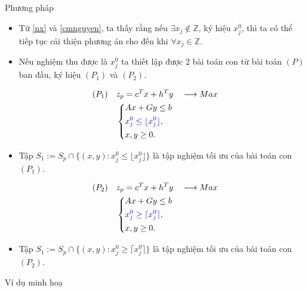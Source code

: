 \documentclass{beamer}
\begin{document}
\begin{frame}{Phương pháp}
\large
\begin{itemize}
\item Từ \eqref{nx} và \eqref{cmnguyen}, ta thấy rằng nếu $\exists x_j \notin \mathbb{Z}$, ký hiệu $x^0_j$, thì ta có thể tiếp tục cải thiện phương án cho đến khi $\forall x_j \in \mathbb{Z}$. 
\item Nếu nghiệm thu được là $x^0_j$ ta thiết lập được 2 bài toán con từ bài toán $(P)$ ban đầu, ký hiệu $(P_1)$ và $(P_2)$.
\end{itemize}
\end{frame}

\begin{frame}
\begin{equation}
    \begin{split}
    (P_1) \quad & z_p=c^Tx+h^Ty \quad \longrightarrow Max \\
                & \left\{\begin{split}
                    &Ax+Gy \leq  b \\
                    &\color{blue} x^0_j \leq \lfloor x^0_j \rfloor , \\
                    &x,y \geq 0.
                \end{split}\right.    
    \end{split}
\end{equation}
\begin{itemize}
\item Tập $S_1:=S_p \cap \{ (x,y): x^0_j \leq \lfloor x^0_j \rfloor \}$ là tập nghiệm tối ưu của bài toán con $(P_1)$.
\end{itemize}
\end{frame}

\begin{frame}
\begin{equation}
    \begin{split}
    (P_2) \quad & z_p=c^Tx+h^Ty \quad \longrightarrow Max \\
                & \left\{\begin{split}
                    &Ax+Gy \leq  b \\
                    &\color{blue} x^0_j \geq \lceil x^0_j \rceil , \\
                    &x,y \geq 0.
                \end{split}\right.    
    \end{split}
\end{equation}
\begin{itemize}
\item Tập $S_1:=S_p \cap \{ (x,y): x^0_j \geq \lceil x^0_j \rceil \}$ là tập nghiệm tối ưu của bài toán con $(P_2)$.
\end{itemize}
\end{frame}

\begin{frame}{Ví dụ minh hoạ}
\end{frame}

\begin{frame}
\end{frame}
\end{document}
